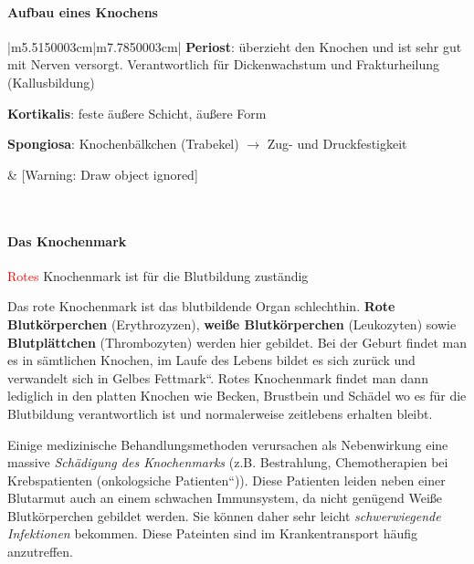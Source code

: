 \documentclass{article}
\newcommand\gT[1]{\textbf{\textup{\textcolor[rgb]{0.0,0.5019608,0.0}{#1}}}}
\newcommand\gE[1]{\textit{#1}}
\newcommand\gZ[1]{\textcolor[rgb]{0.5019608,0.5019608,0.5019608}{#1}}
\begin{document}
\paragraph{Aufbau eines Knochens}
\begin{center}
\tablehead{}\begin{supertabular}{|m{5.5150003cm}|m{7.7850003cm}|}
\hline
{}\gT{Periost}: \"uberzieht den Knochen und
ist sehr gut mit Nerven versorgt.  Verantwortlich f\"ur Dickenwachstum
und Frakturheilung \gZ{(Kallusbildung)}

\gT{Kortikalis}: feste \"au{\ss}ere
Schicht, \"au{\ss}ere Form

\gT{Spongiosa}:
Knochenb\"alkchen (Trabekel) ${\rightarrow}$
Zug- und Druckfestigkeit

 &
[Warning: Draw object ignored]

\\\hline
\end{supertabular}
\end{center}
\paragraph[Das Knochenmark]{Das Knochenmark}
{\mdseries\color{black}
\textcolor{red}{Rotes} Knochenmark ist f\"ur die Blutbildung
zust\"andig}

{\mdseries
Das rote Knochenmark ist das blutbildende Organ schlechthin.
\gT{Rote Blutk\"orperchen}
\gZ{(Erythrozyzen)}, \gT{wei{\ss}e
Blutk\"orperchen} \gZ{(Leukozyten)} sowie
\gT{Blutpl\"attchen}
\gZ{(Thrombozyten)} werden hier gebildet. Bei der
Geburt findet man es in s\"amtlichen Knochen, im Laufe des Lebens
bildet es sich zur\"uck und verwandelt sich in {\quotedblbase}Gelbes
Fettmark{\textquotedblleft}. Rotes Knochenmark findet man dann
lediglich in den platten Knochen wie Becken, Brustbein und Sch\"adel wo
es f\"ur die Blutbildung verantwortlich ist und normalerweise
zeitlebens erhalten bleibt. }

{\mdseries
Einige medizinische Behandlungsmethoden verursachen als Nebenwirkung
eine massive \gE{Sch\"adigung des Knochenmarks} (z.B.
Bestrahlung, Chemotherapien bei Krebspatienten
\gZ{({\quotedblbase}onkologsiche
Patienten{\textquotedblleft})}). Diese Patienten leiden neben einer
Blutarmut auch an einem schwachen Immunsystem, da nicht gen\"ugend
Wei{\ss}e Blutk\"orperchen gebildet werden. Sie k\"onnen daher sehr
leicht \gE{schwerwiegende Infektionen} bekommen. Diese
Pateinten sind im Krankentransport h\"aufig anzutreffen. }
\end{document}
